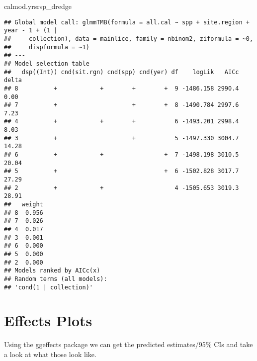 \documentclass[]{article}
\newenvironment{Shaded}{\begin{snugshade}}{\end{snugshade}}
\newcommand{\NormalTok}[1]{#1}
\begin{document}
\begin{Shaded}
\begin{Highlighting}[]
\NormalTok{calmod.yrsrsp_dredge}
\end{Highlighting}
\end{Shaded}

\begin{verbatim}
## Global model call: glmmTMB(formula = all.cal ~ spp + site.region + year - 1 + (1 | 
##     collection), data = mainlice, family = nbinom2, ziformula = ~0, 
##     dispformula = ~1)
## ---
## Model selection table 
##   dsp((Int)) cnd(sit.rgn) cnd(spp) cnd(yer) df    logLik   AICc delta
## 8          +            +        +        +  9 -1486.158 2990.4  0.00
## 7          +                     +        +  8 -1490.784 2997.6  7.23
## 4          +            +        +           6 -1493.201 2998.4  8.03
## 3          +                     +           5 -1497.330 3004.7 14.28
## 6          +            +                 +  7 -1498.198 3010.5 20.04
## 5          +                              +  6 -1502.828 3017.7 27.29
## 2          +            +                    4 -1505.653 3019.3 28.91
##   weight
## 8  0.956
## 7  0.026
## 4  0.017
## 3  0.001
## 6  0.000
## 5  0.000
## 2  0.000
## Models ranked by AICc(x) 
## Random terms (all models): 
## 'cond(1 | collection)'
\end{verbatim}

\section{Effects Plots}\label{effects-plots}

Using the ggeffects package we can get the predicted estimates/95\% CIs
and take a look at what those look like.
\end{document}
